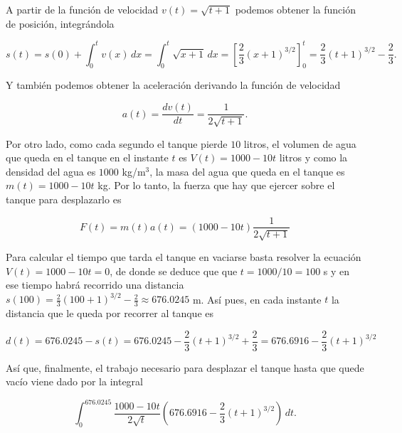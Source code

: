 \documentclass[
  a4paper,
]{scrreport}
\theoremstyle{definition}
\theoremstyle{remark}
\begin{document}
\begin{tcolorbox}[enhanced jigsaw, opacityback=0, bottomtitle=1mm, coltitle=black, opacitybacktitle=0.6, colback=white, breakable, left=2mm, titlerule=0mm, bottomrule=.15mm, colbacktitle=quarto-callout-tip-color!10!white, toprule=.15mm, leftrule=.75mm, arc=.35mm, toptitle=1mm, colframe=quarto-callout-tip-color-frame, title=\textcolor{quarto-callout-tip-color}{\faLightbulb}\hspace{0.5em}{Solución}, rightrule=.15mm]

A partir de la función de velocidad \(v(t) = \sqrt{t+1}\) podemos
obtener la función de posición, integrándola

\[
s(t) 
= s(0) + \int_0^t v(x)\,dx
= \int_0^t \sqrt{x+1}\,dx
= \left[\frac{2}{3}(x+1)^{3/2}\right]_0^t
= \frac{2}{3}(t+1)^{3/2} - \frac{2}{3}.
\]

Y también podemos obtener la aceleración derivando la función de
velocidad

\[
a(t)
= \frac{dv(t)}{dt}
= \frac{1}{2\sqrt{t+1}}.
\]

Por otro lado, como cada segundo el tanque pierde \(10\) litros, el
volumen de agua que queda en el tanque en el instante \(t\) es
\(V(t) = 1000 - 10t\) litros y como la densidad del agua es \(1000\)
kg/m\(^3\), la masa del agua que queda en el tanque es
\(m(t) = 1000 - 10t\) kg. Por lo tanto, la fuerza que hay que ejercer
sobre el tanque para desplazarlo es

\[
F(t) = m(t)a(t) = (1000 - 10t)\frac{1}{2\sqrt{t+1}}
\]

Para calcular el tiempo que tarda el tanque en vaciarse basta resolver
la ecuación \(V(t)=1000-10t = 0\), de donde se deduce que que
\(t=1000/10=100\) s y en ese tiempo habrá recorrido una distancia
\(s(100) = \frac{2}{3}(100+1)^{3/2} - \frac{2}{3} \approx 676.0245\) m.
Así pues, en cada instante \(t\) la distancia que le queda por recorrer
al tanque es

\[
d(t) 
= 676.0245 - s(t)
= 676.0245 - \frac{2}{3}(t+1)^{3/2} + \frac{2}{3}
= 676.6916 - \frac{2}{3}(t+1)^{3/2}
\]

Así que, finalmente, el trabajo necesario para desplazar el tanque hasta
que quede vacío viene dado por la integral

\[
\int_0^{676.0245} \frac{1000-10t}{2\sqrt{t}} (676.6916 - \frac{2}{3}(t+1)^{3/2})\,dt.
\]

\end{tcolorbox}

\end{document}
